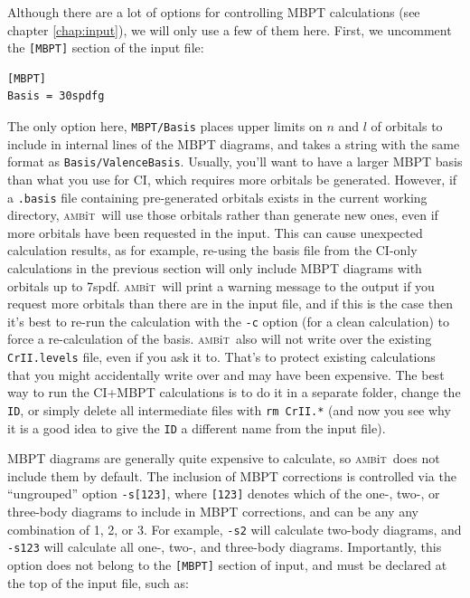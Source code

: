 \documentclass{report}
\newcommand{\ambit}{\textsc{amb}{\footnotesize i}\textsc{t}}
\begin{document}
Although there are a lot of options for controlling MBPT calculations (see chapter \ref{chap:input}), we
will only use a few of them here. First, we uncomment the \texttt{[MBPT]} section of the input file:

\begin{verbatim}
[MBPT]
Basis = 30spdfg
\end{verbatim}

The only option here, \texttt{MBPT/Basis} places upper limits on $n$ and $l$ of orbitals to include in
internal lines of the MBPT diagrams, and takes a string with the same format as
\texttt{Basis/ValenceBasis}. Usually, you'll want to have a larger MBPT basis than what
you use for CI, which requires more orbitals be generated. However, if a \texttt{.basis} file containing
pre-generated orbitals exists in the current working directory, \ambit\ will use those
orbitals rather than generate new ones, even if more orbitals have been requested in the
input. This can cause unexpected calculation results, as for example, re-using the basis
file from the CI-only calculations in the previous section will only include MBPT
diagrams with orbitals up to 7spdf. \ambit\ will print a warning message to the output if
you request more orbitals than there are in the input file, and if this is the case then
it's best to re-run the calculation with the \texttt{-c} option (for a clean calculation)
to force a re-calculation of the basis. \ambit\ also will not write over the existing \texttt{CrII.levels} file, even if you ask it to. That's to protect existing calculations that you might accidentally write over and may have been expensive. The best way to run the CI+MBPT calculations is to do it in a separate folder, change the \texttt{ID}, or simply delete all intermediate files with \texttt{rm CrII.*} (and now you see why it is a good idea to give the \texttt{ID} a different name from the input file).

MBPT diagrams are generally quite expensive to calculate, so \ambit\  does not include them
by default. The inclusion of MBPT corrections is controlled via the ``ungrouped'' option
\texttt{-s[123]}, where \texttt{[123]} denotes which of the one-, two-, or three-body diagrams to 
include in MBPT corrections, and can be any any combination of 1, 2, or 3. For example, \texttt{-s2} 
will calculate two-body diagrams, and \texttt{-s123} will calculate all one-, two-, and three-body 
diagrams. Importantly, this option does not belong to the \texttt{[MBPT]} section of input, and must be
declared at the top of the input file, such as:
\end{document}
